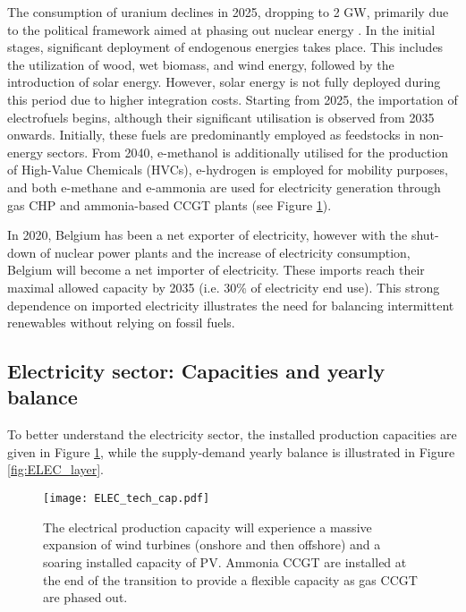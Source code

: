 The consumption of uranium declines in 2025, dropping to 2 GW, primarily due to the political framework aimed at phasing out nuclear energy \cite{nuclear_2035}. In the initial stages, significant deployment of endogenous energies takes place. This includes the utilization of wood, wet biomass, and wind energy, followed by the introduction of solar energy. However, solar energy is not fully deployed during this period due to higher integration costs. Starting from 2025, the importation of electrofuels begins, although their significant utilisation is observed from 2035 onwards. Initially, these fuels are predominantly employed as feedstocks in non-energy sectors. From 2040, e-methanol is additionally utilised for the production of High-Value Chemicals (HVCs), e-hydrogen is employed for mobility purposes, and both e-methane and e-ammonia are used for electricity generation through gas \gls{CHP} and ammonia-based \gls{CCGT} plants (see Figure \ref{fig:ELEC_tech_cap}).

In 2020, Belgium has been a net exporter of electricity, however with the shut-down of nuclear power plants and the increase of electricity consumption, Belgium will become a net importer of electricity. These imports reach their maximal allowed capacity by 2035 (i.e. 30\% of electricity end use). This strong dependence on imported electricity illustrates the need for balancing intermittent renewables without relying on fossil fuels.

\subsection{Electricity sector: Capacities and yearly balance}
\label{subsubsec:elec_sector}
To better understand the electricity sector, the installed production capacities are given in Figure \ref{fig:ELEC_tech_cap}, while the supply-demand yearly balance is illustrated in Figure \ref{fig:ELEC_layer}.

\begin{figure}[!htbp]
     \centering
         \texttt{[image: ELEC\_tech\_cap.pdf]}
         \caption{The electrical production capacity will experience a massive expansion of wind turbines (onshore and then offshore) and a soaring installed capacity of \gls{PV}. Ammonia \gls{CCGT} are installed at the end of the transition to provide a flexible capacity as gas \gls{CCGT} are phased out.}
         \label{fig:ELEC_tech_cap}
\end{figure}


